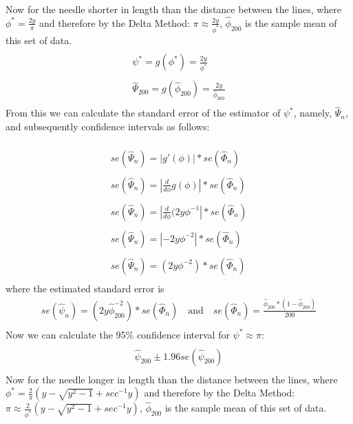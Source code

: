 Now for the needle shorter in length than the distance between the lines, where $\phi^*=\frac{2y}{\pi}$ and therefore by the Delta Method: $\pi\approx\frac{2y}{\phi^*}$, $\hat{\phi}_{200}$ is the sample mean of this set of data.
\begin{displaymath}
\begin{array}{l}
\\\psi^*=g(\phi^*)=\frac{2y}{\phi^*}\\
\\\hat{\Psi}_{200}=g(\hat{\phi}_{200})=\frac{2y}{\hat{\phi}_{200}}\\
\end{array}
\end{displaymath}
\noindent
From this we can calculate the standard error of the estimator of $\psi^*$, namely, $\hat{\Psi}_n$, and subsequently confidence intervals as follows:

\begin{displaymath}
\begin{array}{l}
\\se(\hat{\Psi}_n)=|g'( \phi)|*se(\hat{\Phi}_n)\\
\\se(\hat{\Psi}_n)=|\frac{d}{d \phi}g( \phi)|*se(\hat{\Phi}_n)\\
\\se(\hat{\Psi}_n)=|\frac{d}{d \phi}(2y \phi^{-1}|*se(\hat{\Phi}_n)\\
\\se(\hat{\Psi}_n)=|-2y \phi^{-2}|*se(\hat{\Phi}_n)\\
\\se(\hat{\Psi}_n)=(2y \phi^{-2})*se(\hat{\Phi}_n)\\
\end{array}
\end{displaymath}
\noindent
where the estimated standard error is
\begin{displaymath}
\begin{array}{l}
se(\hat{\psi}_n)=(2y \hat{\phi}_{200}^{-2})*se(\hat{\Phi}_n) \quad \text{and} \quad se(\hat{\Phi}_n)=\frac{\hat{\phi}_{200}*(1-\hat{\phi}_{200})}{200}\\
\end{array}
\end{displaymath}
Now we can calculate the 95\% confidence interval for $\psi^*\approx\pi$:
\begin{displaymath}
\begin{array}{l}
\\\hat{\psi}_{200}\pm1.96 se(\hat{\psi}_{200})\\
\end{array}
\end{displaymath}
\noindent
Now for the needle longer in length than the distance between the lines, where $\phi^*=\frac{2}{\pi}(y-\sqrt{y^2-1}+sec^{-1}y)$ and therefore by the Delta Method: $\pi\approx\frac{2}{\phi^*}(y-\sqrt{y^2-1}+sec^{-1}y)$, $\hat{\phi}_{200}$ is the sample mean of this set of data.

